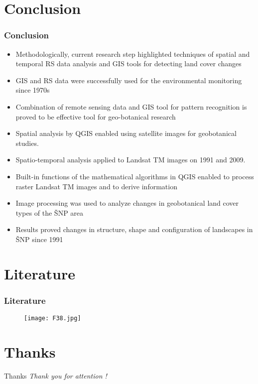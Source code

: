\documentclass[pdflatex,compress,8pt,
	xcolor={dvipsnames,dvipsnames,svgnames,x11names,table},
	hyperref={
	breaklinks = true, 
	pdfauthor={Lemenkova Polina}, 
	pdfsubject={Preentation}, 
	pdfcreator={Lemenkova Polina}, 
	pdfproducer={Lemenkova Polina}, 
	colorlinks=true,linkcolor=blue, 
	citecolor=NavyBlue, 
	urlcolor = NavyBlue, 
	breaklinks = true}]{beamer}
\begin{document}
\section{Conclusion}
\begin{frame}\frametitle{Conclusion}
\begin{itemize}
	\item Methodologically, current research step highlighted techniques of spatial and temporal RS data analysis and GIS tools for detecting land cover changes
	\item GIS and RS data were successfully used for the environmental monitoring since 1970s
	\item Combination of remote sensing data and GIS tool for pattern recognition is proved to be effective tool for geo-botanical research
	\item Spatial analysis by QGIS enabled using satellite images for geobotanical studies.
	\item Spatio-temporal analysis applied to Landsat TM images on 1991 and 2009. 
	\item Built-in functions of the mathematical algorithms in QGIS enabled to process raster Landsat TM images and to derive information
	\item Image processing was used to analyze changes in geobotanical land cover types of the ŠNP area
	\item Results proved changes in structure, shape and configuration of landscapes in ŠNP since 1991
\end{itemize}
\end{frame}

\section{Literature}
\begin{frame}\frametitle{Literature}
\begin{figure}[H]
	\centering
		\texttt{[image: F38.jpg]}
\end{figure}
\end{frame}

\section{Thanks}
\begin{frame}{Thanks}
  	\centering \LARGE 
  	\emph{Thank you for attention !}\\
\end{frame}
\end{document}
